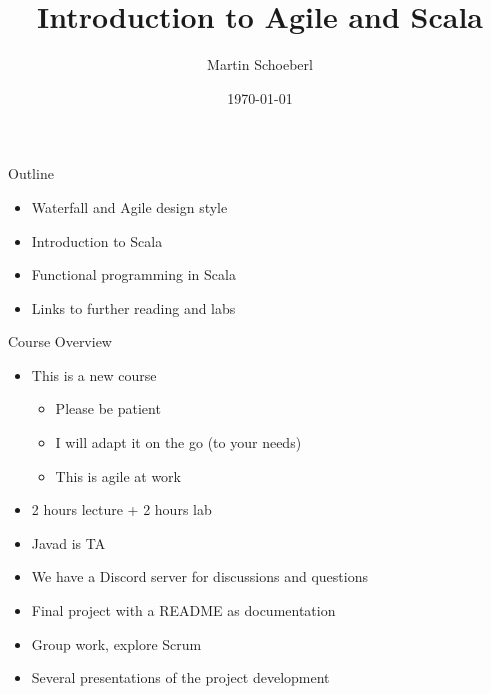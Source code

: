 

\newif\ifbook


\usepackage{tikz}
\usetikzlibrary{positioning, arrows.meta}


\title{Introduction to Agile and Scala}
\author{Martin Schoeberl}
\date{\today}



\begin{frame}
\titlepage
\end{frame}




\begin{frame}[fragile]{Outline}
\begin{itemize}
\item Waterfall and Agile design style
\item Introduction to Scala
\item Functional programming in Scala
\item Links to further reading and labs
\end{itemize}
\end{frame}

\begin{frame}[fragile]{Course Overview}
\begin{itemize}
\item This is a new course
\begin{itemize}
\item Please be patient
\item I will adapt it on the go (to your needs)
\item This is agile at work
\end{itemize}
\item 2 hours lecture + 2 hours lab
\item Javad is TA
\item We have a Discord server for discussions and questions
\item Final project with a README as documentation
\item Group work, explore Scrum
\item Several presentations of the project development
\end{itemize}
\end{frame}

